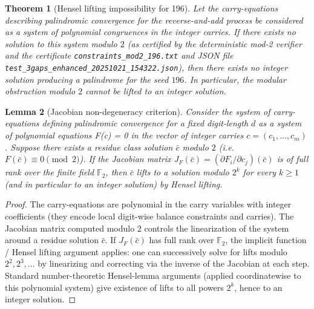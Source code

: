 \documentclass[12pt,a4paper]{article}
\newtheorem{theorem}{Theorem}[section]
\newtheorem{lemma}[theorem]{Lemma}
\begin{document}
\begin{theorem}[Hensel lifting impossibility for 196]\label{thm:hensel_impossibility_196}
Let the carry-equations describing palindromic convergence for the reverse-and-add process be considered as a system of polynomial congruences in the integer carries. If there exists no solution to this system modulo $2$ (as certified by the deterministic mod-2 verifier and the certificate \texttt{constraints\_mod2\_196.txt} and JSON file \texttt{test\_3gaps\_enhanced\_20251021\_154322.json}), then there exists no integer solution producing a palindrome for the seed $196$. In particular, the modular obstruction modulo $2$ cannot be lifted to an integer solution.
\end{theorem}

\begin{lemma}[Jacobian non-degeneracy criterion]\label{lem:hensel_jacobian}
Consider the system of carry-equations defining palindromic convergence for a fixed digit-length $d$ as a system of polynomial equations F(c) = 0 in the vector of integer carries $c = (c_1,\dots,c_m)$. Suppose there exists a residue class solution $\bar c$ modulo $2$ (i.e. $F(\bar c) \equiv 0 \pmod 2$). If the Jacobian matrix $J_F(\bar c) = (\partial F_i/\partial c_j)(\bar c)$ is of full rank over the finite field $\mathbb F_2$, then $\bar c$ lifts to a solution modulo $2^k$ for every $k\ge 1$ (and in particular to an integer solution) by Hensel lifting.
\end{lemma}

\begin{proof}
The carry-equations are polynomial in the carry variables with integer coefficients (they encode local digit-wise balance constraints and carries). The Jacobian matrix computed modulo $2$ controls the linearization of the system around a residue solution $\bar c$. If $J_F(\bar c)$ has full rank over $\mathbb F_2$, the implicit function / Hensel lifting argument applies: one can successively solve for lifts modulo $2^2,2^3,\dots$ by linearizing and correcting via the inverse of the Jacobian at each step. Standard number-theoretic Hensel-lemma arguments (applied coordinatewise to this polynomial system) give existence of lifts to all powers $2^k$, hence to an integer solution.
\end{proof}
\end{document}

